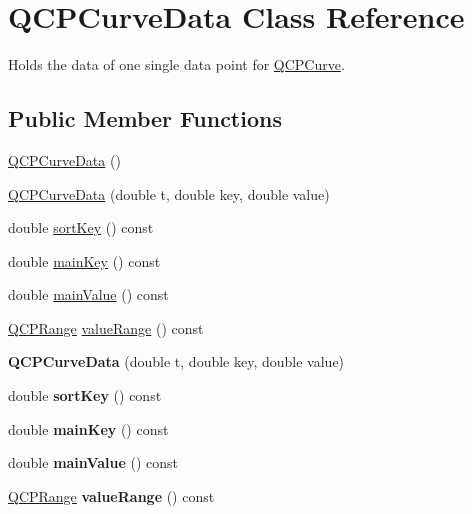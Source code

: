\hypertarget{class_q_c_p_curve_data}{}\section{Q\+C\+P\+Curve\+Data Class Reference}
\label{class_q_c_p_curve_data}


Holds the data of one single data point for \hyperlink{class_q_c_p_curve}{Q\+C\+P\+Curve}.  


\subsection*{Public Member Functions}
\begin{DoxyCompactItemize}
\item 
\hyperlink{class_q_c_p_curve_data_a48252779b5198a509d99c69ae223fbf8}{Q\+C\+P\+Curve\+Data} ()
\item 
\hyperlink{class_q_c_p_curve_data_a3586be0cc6f8db15bcdd0c0d03b0c173}{Q\+C\+P\+Curve\+Data} (double t, double key, double value)
\item 
double \hyperlink{class_q_c_p_curve_data_a583174f2b68e01b4d545f04571f58bd0}{sort\+Key} () const
\item 
double \hyperlink{class_q_c_p_curve_data_ac805ffc8b4207652efb9fcc6a2cdd3e8}{main\+Key} () const
\item 
double \hyperlink{class_q_c_p_curve_data_a39a94131e5f62f16b256bcf8c47a3205}{main\+Value} () const
\item 
\hyperlink{class_q_c_p_range}{Q\+C\+P\+Range} \hyperlink{class_q_c_p_curve_data_acf15deffd18d400651f8384a95dad9f8}{value\+Range} () const
\item 
\mbox{\label{class_q_c_p_curve_data_a3586be0cc6f8db15bcdd0c0d03b0c173}} 
{\bfseries Q\+C\+P\+Curve\+Data} (double t, double key, double value)
\item 
\mbox{\label{class_q_c_p_curve_data_a583174f2b68e01b4d545f04571f58bd0}} 
double {\bfseries sort\+Key} () const
\item 
\mbox{\label{class_q_c_p_curve_data_ac805ffc8b4207652efb9fcc6a2cdd3e8}} 
double {\bfseries main\+Key} () const
\item 
\mbox{\label{class_q_c_p_curve_data_a39a94131e5f62f16b256bcf8c47a3205}} 
double {\bfseries main\+Value} () const
\item 
\mbox{\label{class_q_c_p_curve_data_acf15deffd18d400651f8384a95dad9f8}} 
\hyperlink{class_q_c_p_range}{Q\+C\+P\+Range} {\bfseries value\+Range} () const
\end{DoxyCompactItemize}
